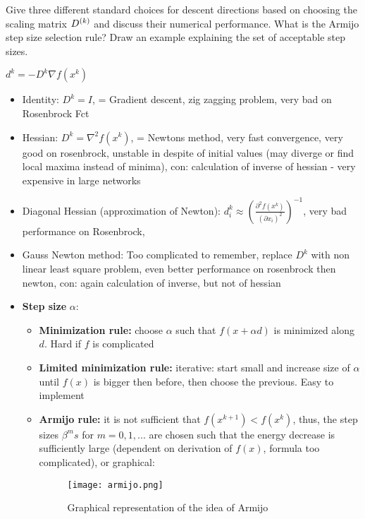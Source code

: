 \documentclass{article}
\begin{document}
\begin{question}
  Give three different standard choices for descent directions based on choosing the scaling matrix
  \(D^{(k)}\) and discuss their numerical performance. What is the Armijo step size selection
  rule? Draw an example explaining the set of acceptable step sizes.
\end{question}
$d^k = -D^k \nabla f (x^k )$
\begin{itemize}
\item Identity: $D^k = I$, = Gradient descent, zig zagging problem, very bad on Rosenbrock Fct
\item Hessian: $D^k = \nabla^2 f(x^k)$, = Newtons method, very fast convergence, very good on
  rosenbrock, unstable in despite of initial values (may diverge or find local maxima instead of
  minima), con: calculation of inverse of hessian - very expensive in large networks
\item Diagonal Hessian (approximation of Newton): $d_i^k \approx \left(
    \frac{\partial^2  f (x^k)}{(\partial x_i)^2}
  \right)^{-1}$, very bad performance on Rosenbrock, 
\item Gauss Newton method: Too complicated to remember, replace $D^k$ with non linear least square
  problem, even better performance on rosenbrock then newton, con: again calculation of inverse, but
  not of hessian
\item \textbf{Step size} $\alpha$: 
  \begin{itemize}
  \item \textbf{Minimization rule:} choose $\alpha$ such that $f(x + \alpha d)$ is minimized along
    $d$. Hard if $f$ is complicated
  \item \textbf{Limited minimization rule:} iterative: start small and increase size of $\alpha$
    until $f(x)$ is bigger then before, then choose the previous. Easy to implement
  \item \textbf{Armijo rule:} it is not sufficient that $f(x^{k+1}) < f(x^k)$, thus, the step sizes
    $\beta^ms$ for $m = 0,1,...$ are chosen such that the energy decrease is sufficiently large
    (dependent on derivation of $f(x)$, formula too complicated), or graphical:
    \begin{figure}[H]
      \texttt{[image: armijo.png]}
      \caption{Graphical representation of the idea of Armijo\label{fig:desc_dir}}
    \end{figure}
    
  \end{itemize}
\end{itemize}
\end{document}
